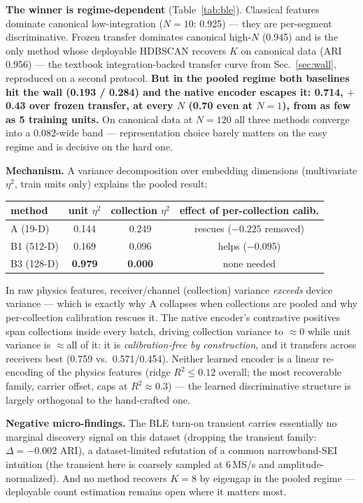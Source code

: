 \documentclass[conference]{IEEEtran}
\begin{document}
\textbf{The winner is regime-dependent} (Table~\ref{tab:ble}). Classical features dominate
canonical low-integration ($N{=}10$: 0.925) --- they are per-segment discriminative. Frozen
transfer dominates canonical high-$N$ (0.945) and is the only method whose deployable HDBSCAN
recovers $K$ on canonical data (ARI 0.956) --- the textbook integration-backed transfer curve
from Sec.~\ref{sec:wall}, reproduced on a second protocol. \textbf{But in the pooled regime both
baselines hit the wall (0.193 / 0.284) and the native encoder escapes it: 0.714, $+$0.43 over
frozen transfer, at every $N$ (0.70 even at $N{=}1$), from as few as 5 training units.} On
canonical data at $N{=}120$ all three methods converge into a 0.082-wide band ---
representation choice barely matters on the easy regime and is decisive on the hard one.

\textbf{Mechanism.} A variance decomposition over embedding dimensions (multivariate $\eta^2$,
train units only) explains the pooled result:

\begin{table}[h]
\centering\small
\begin{tabular}{lccc}
\toprule
method & unit $\eta^2$ & collection $\eta^2$ & effect of per-collection calib. \\
\midrule
A (19-D) & 0.144 & 0.249 & rescues ($-0.225$ removed) \\
B1 (512-D) & 0.169 & 0.096 & helps ($-0.095$) \\
B3 (128-D) & \textbf{0.979} & \textbf{0.000} & none needed \\
\bottomrule
\end{tabular}
\end{table}

In raw physics features, receiver/channel (collection) variance \emph{exceeds} device variance
--- which is exactly why A collapses when collections are pooled and why per-collection
calibration rescues it. The native encoder's contrastive positives span collections inside every
batch, driving collection variance to $\approx$0 while unit variance is $\approx$all of it: it is
\emph{calibration-free by construction}, and it transfers across receivers best (0.759 vs.\
0.571/0.454). Neither learned encoder is a linear re-encoding of the physics features (ridge
$R^2 \le 0.12$ overall; the most recoverable family, carrier offset, caps at $R^2\!\approx\!0.3$)
--- the learned discriminative structure is largely orthogonal to the hand-crafted one.

\textbf{Negative micro-findings.} The BLE turn-on transient carries essentially no marginal
discovery signal on this dataset (dropping the transient family: $\Delta{=}-0.002$ ARI), a
dataset-limited refutation of a common narrowband-SEI intuition (the transient here is coarsely
sampled at 6\,MS/s and amplitude-normalized). And no method recovers $K{=}8$ by eigengap in the
pooled regime --- deployable count estimation remains open where it matters most.
\end{document}
